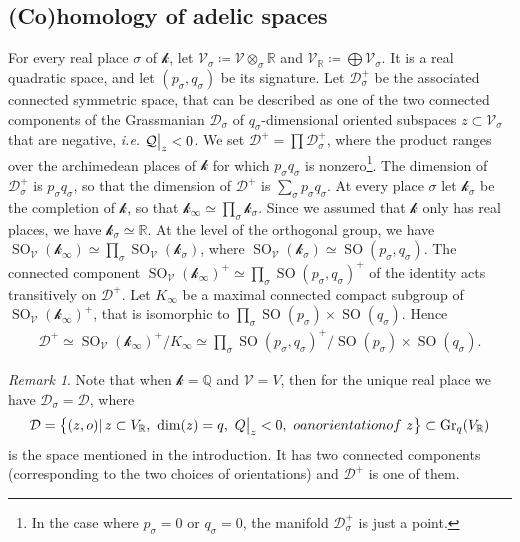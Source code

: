 \documentclass[11pt]{article} %
\newcommand{\8}{\infty}
\newcommand{\kbf}{\mathcal{k}}
\newcommand{\SO}{\operatorname{SO}}
\newcommand{\D}{\mathcal{D}}
\newcommand{\R}{\mathbb{R}}
\newcommand{\Q}{\mathbb{Q}}
\newcommand{\Vcal}{\mathcal{V}}
\newcommand{\Qcal}{\mathcal{Q}}
\newcommand\restr[2]{{%
  \left.\kern-\nulldelimiterspace %
  #1 %
  \vphantom{\big|} %
  \right|_{#2} %
  }}
\theoremstyle{mytheoremstyle}
\theoremstyle{remark}
\newtheorem{rmk}{Remark}[section]
\numberwithin{equation}{section}
\begin{document}
\subsection{(Co)homology of adelic spaces} \label{subsecadelic} For every real place $\sigma$ of $\kbf$, let $\Vcal_\sigma \coloneqq \Vcal \otimes_\sigma \R$ and $\Vcal_\R \coloneqq \bigoplus \Vcal_\sigma$. It is a real quadratic space, and let $(p_\sigma,q_\sigma)$ be its signature. Let $\D_{\sigma}^{+}$ be the associated connected symmetric space, that can be described as one of the two connected { components} of the Grassmanian $\D_\sigma$ of $q_\sigma$-dimensional oriented subspaces $z \subset \Vcal_\sigma$ that are negative, {\em i.e.} $\restr{\Qcal}{z}<0$. We set $\D^+=\prod \D_{\sigma}^{+}$, where the product ranges over the archimedean places of $\kbf$ for which $p_\sigma q_\sigma$ is nonzero\footnote{In the case where $p_\sigma=0$ or $q_\sigma=0$, the manifold $\D_{\sigma}^{+}$ is just a point.}. The dimension of $\D^+_\sigma$ is $p_\sigma q_\sigma$, so that the dimension of $\D^+$ is $\sum_\sigma p_\sigma q_\sigma$. At every place $\sigma$ let $\kbf_\sigma$ be the completion of $\kbf$, so that $\kbf_\8 \simeq \prod_\sigma \kbf_\sigma$. Since we assumed that $\kbf$ only has real places, we have $\kbf_\sigma \simeq \R$. At the level of the orthogonal group, we have $\SO_{\Vcal}(\kbf_\8) \simeq { \prod_{\sigma} \SO_{\Vcal}(\kbf_\sigma)}$, where $\SO_{\Vcal}(\kbf_\sigma) \simeq \SO(p_\sigma,q_\sigma)$. The connected component $\SO_{\Vcal}(\kbf_\8)^+ \simeq \prod_\sigma \SO(p_\sigma,q_\sigma)^+$ of the identity acts transitively on $\D^+$. Let $K_\8$ be a maximal connected compact subgroup of $\SO_{\Vcal}(\kbf_\8)^+$, that is isomorphic to  $ \prod_{\sigma}\SO(p_\sigma) \times \SO(q_\sigma)$. Hence 
\begin{align}
    \D^+ \simeq \SO_{\Vcal}(\kbf_\8)^+/K_\8 \simeq \prod_\sigma \SO(p_\sigma,q_\sigma)^+/ \SO(p_\sigma) \times \SO(q_\sigma).
\end{align}
\begin{rmk} Note that when $\kbf=\Q$ and $\Vcal=V$, then for the unique real place we have $\D_{\sigma}=\D$, where 
\begin{align}
    \D=\left \{ \left (z,o) \right \vert z \subset V_\R, \ \dim(z)=q, \ \restr{Q}{z}<0, \ o \textrm{ an orientation of} \ z \right \} \subset \operatorname{Gr}_q(V_\R)
\end{align}
is the space { mentioned} in the introduction. It has two connected components (corresponding to the two choices of orientations) and $\D^+$ is one of them.   
\end{rmk}
\end{document}
